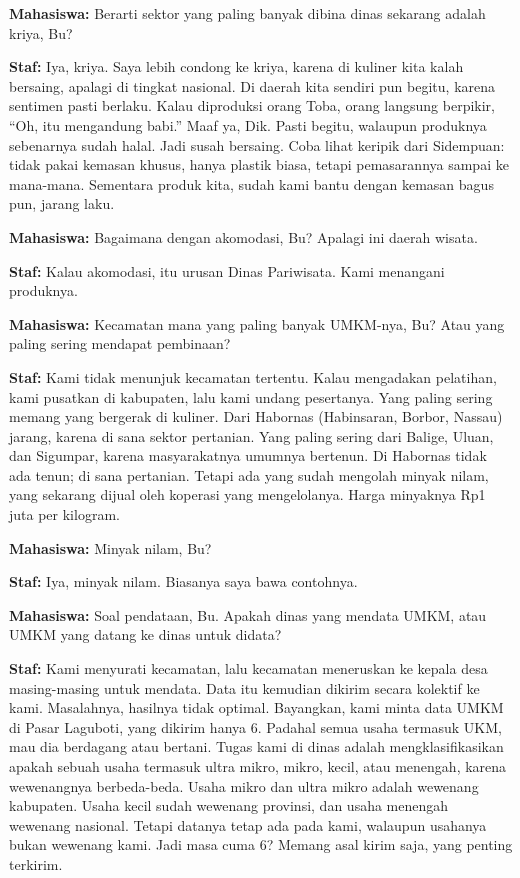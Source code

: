 {\noindent \textbf{Mahasiswa:} Berarti sektor yang paling banyak dibina dinas sekarang adalah kriya, Bu?

\noindent \textbf{Staf:} Iya, kriya. Saya lebih condong ke kriya, karena di kuliner kita kalah bersaing, apalagi di tingkat nasional. Di daerah kita sendiri pun begitu, karena sentimen pasti berlaku. Kalau diproduksi orang Toba, orang langsung berpikir, ``Oh, itu mengandung babi.'' Maaf ya, Dik. Pasti begitu, walaupun produknya sebenarnya sudah halal. Jadi susah bersaing. Coba lihat keripik dari Sidempuan: tidak pakai kemasan khusus, hanya plastik biasa, tetapi pemasarannya sampai ke mana-mana. Sementara produk kita, sudah kami bantu dengan kemasan bagus pun, jarang laku.

\noindent \textbf{Mahasiswa:} Bagaimana dengan akomodasi, Bu? Apalagi ini daerah wisata.

\noindent \textbf{Staf:} Kalau akomodasi, itu urusan Dinas Pariwisata. Kami menangani produknya.

\noindent \textbf{Mahasiswa:} Kecamatan mana yang paling banyak UMKM-nya, Bu? Atau yang paling sering mendapat pembinaan?

\noindent \textbf{Staf:} Kami tidak menunjuk kecamatan tertentu. Kalau mengadakan pelatihan, kami pusatkan di kabupaten, lalu kami undang pesertanya. Yang paling sering memang yang bergerak di kuliner. Dari Habornas (Habinsaran, Borbor, Nassau) jarang, karena di sana sektor pertanian. Yang paling sering dari Balige, Uluan, dan Sigumpar, karena masyarakatnya umumnya bertenun. Di Habornas tidak ada tenun; di sana pertanian. Tetapi ada yang sudah mengolah minyak nilam, yang sekarang dijual oleh koperasi yang mengelolanya. Harga minyaknya Rp1 juta per kilogram.

\noindent \textbf{Mahasiswa:} Minyak nilam, Bu?

\noindent \textbf{Staf:} Iya, minyak nilam. Biasanya saya bawa contohnya.

\noindent \textbf{Mahasiswa:} Soal pendataan, Bu. Apakah dinas yang mendata UMKM, atau UMKM yang datang ke dinas untuk didata?

\noindent \textbf{Staf:} Kami menyurati kecamatan, lalu kecamatan meneruskan ke kepala desa masing-masing untuk mendata. Data itu kemudian dikirim secara kolektif ke kami. Masalahnya, hasilnya tidak optimal. Bayangkan, kami minta data UMKM di Pasar Laguboti, yang dikirim hanya 6. Padahal semua usaha termasuk UKM, mau dia berdagang atau bertani. Tugas kami di dinas adalah mengklasifikasikan apakah sebuah usaha termasuk ultra mikro, mikro, kecil, atau menengah, karena wewenangnya berbeda-beda. Usaha mikro dan ultra mikro adalah wewenang kabupaten. Usaha kecil sudah wewenang provinsi, dan usaha menengah wewenang nasional. Tetapi datanya tetap ada pada kami, walaupun usahanya bukan wewenang kami. Jadi masa cuma 6? Memang asal kirim saja, yang penting terkirim.

}
